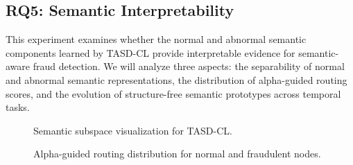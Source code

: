 \subsection{RQ5: Semantic Interpretability}
\label{subsec:interpretability}

This experiment examines whether the normal and abnormal semantic components learned by TASD-CL provide interpretable evidence for semantic-aware fraud detection. We will analyze three aspects: the separability of normal and abnormal semantic representations, the distribution of alpha-guided routing scores, and the evolution of structure-free semantic prototypes across temporal tasks.


\begin{figure}[!htbp]
  \centering
  \caption{Semantic subspace visualization for TASD-CL.}
  \label{fig:semantic-visualization}
\end{figure}
\FloatBarrier

\begin{figure}[!htbp]
  \centering
  \caption{Alpha-guided routing distribution for normal and fraudulent nodes.}
  \label{fig:alpha-routing}
\end{figure}
\FloatBarrier
